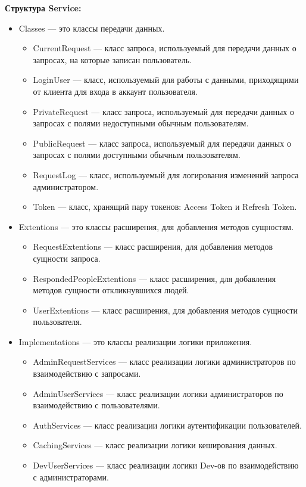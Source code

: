 \textbf{Структура Service:}
\begin{itemize}
	\item{Classes --- это классы передачи данных.
			\begin{itemize}
				\item{CurrentRequest --- класс запроса, используемый для передачи данных о запросах, на которые записан пользователь.}
				\item{LoginUser --- класс, используемый для работы с данными, приходящими от клиента для входа в аккаунт пользователя.}
				\item{PrivateRequest --- класс запроса, используемый для передачи данных о запросах с полями недоступными обычным пользователям.}
				\item{PublicRequest --- класс запроса, используемый для передачи данных о запросах с полями доступными обычным пользователям.}
				\item{RequestLog --- класс, используемый для логирования изменений запроса администратором.}
				\item{Token --- класс, хранящий пару токенов: Access Token и Refresh Token.}
			\end{itemize}
		}
	\item{Extentions --- это классы расширения, для добавления методов сущностям.
			\begin{itemize}
				\item{RequestExtentions --- класс расширения, для добавления методов сущности запроса.}
				\item{RespondedPeopleExtentions --- класс расширения, для добавления методов сущности откликнувшихся людей.}
				\item{UserExtentions --- класс расширения, для добавления методов сущности пользователя.}
			\end{itemize}
		}
	\item{Implementations --- это классы реализации логики приложения.
			\begin{itemize}
				\item{AdminRequestServices --- класс реализации логики администраторов по взаимодействию с запросами.}
				\item{AdminUserServices --- класс реализации логики администраторов по взаимодействию с пользователями.}
				\item{AuthServices --- класс реализации логики аутентификации пользователей.}
				\item{CachingServices --- класс реализации логики кеширования данных.}
				\item{DevUserServices --- класс реализации логики Dev-ов по взаимодействию с администраторами.}

\end{itemize}}
\end{itemize}
